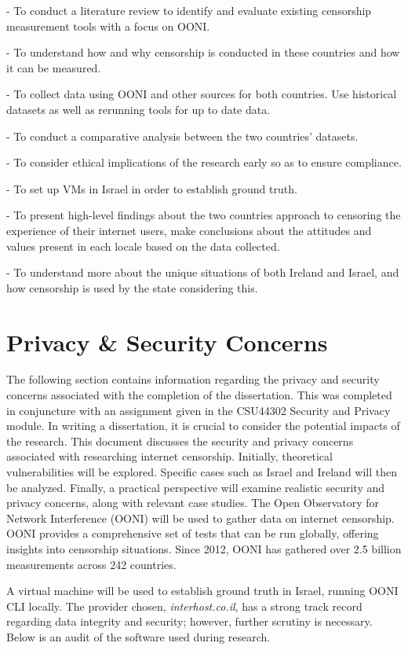 -   To conduct a literature review to identify and evaluate existing censorship measurement tools with a focus on OONI. 

-   To understand how and why censorship is conducted in these countries and how it can be measured. 

-   To collect data using OONI and other sources for both countries. Use historical datasets as well as rerunning tools for up to date data. 

-   To conduct a comparative analysis between the two countries’ datasets. 

-   To consider ethical implications of the research early so as to ensure compliance. 

-   To set up VMs in Israel in order to establish ground truth. 

-   To present high-level findings about the two countries approach to censoring the 
experience of their internet users, make conclusions about the attitudes and values 
present in each locale based on the data collected. 

-   To understand more about the unique situations of both Ireland and Israel, and how 
censorship is used by the state considering this.

\section{Privacy \& Security Concerns}
The following section contains information regarding the privacy and security concerns associated with the completion of the dissertation. This was completed in conjuncture with an assignment given in the CSU44302 Security and Privacy module. 
In writing a dissertation, it is crucial to consider the potential impacts of the research. This document discusses the security and privacy concerns associated with researching internet censorship. Initially, theoretical vulnerabilities will be explored. Specific cases such as Israel and Ireland will then be analyzed. Finally, a practical perspective will examine realistic security and privacy concerns, along with relevant case studies.
The Open Observatory for Network Interference (OONI) will be used to gather data on internet censorship. OONI provides a comprehensive set of tests that can be run globally, offering insights into censorship situations. Since 2012, OONI has gathered over 2.5 billion measurements across 242 countries.

A virtual machine will be used to establish ground truth in Israel, running OONI CLI locally. The provider chosen, \textit{interhost.co.il}, has a strong track record regarding data integrity and security; however, further scrutiny is necessary. Below is an audit of the software used during research.

